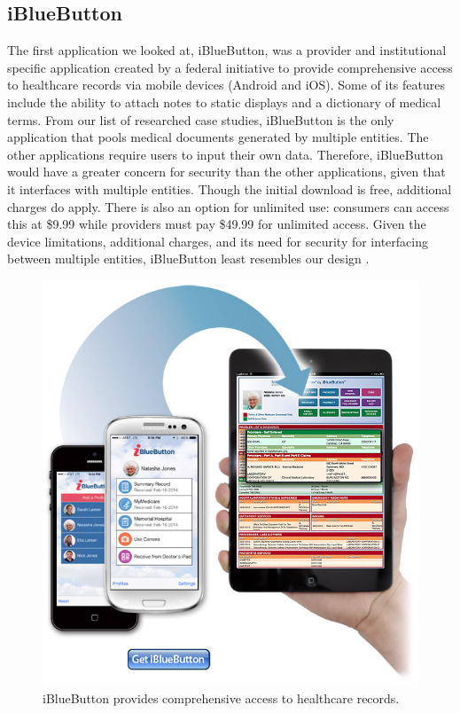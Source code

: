 \documentclass[twocolumn,12pt]{article}
\begin{document}
\subsection{iBlueButton}
The first application we looked at, iBlueButton, was a provider and institutional specific application created by a federal initiative to provide comprehensive access to healthcare records via mobile devices (Android and iOS). Some of its features include the ability to attach notes to static displays and a dictionary of medical terms. From our list of researched case studies, iBlueButton is the only application that pools medical documents generated by multiple entities. The other applications require users to input their own data. Therefore, iBlueButton would have a greater concern for security than the other applications, given that it interfaces with multiple entities. Though the initial download is free, additional charges do apply. There is also an option for unlimited use: consumers can access this at \$9.99 while providers must pay \$49.99 for unlimited access.  Given the device limitations, additional charges, and its need for security for interfacing between multiple entities, iBlueButton least resembles our design \cite{ibluebutton}.

\begin{figure}[!htb] 
	\centering
	\includegraphics[scale=.2]{./490/consumer.jpg}
	\caption{iBlueButton provides comprehensive access to healthcare records.}
\end{figure}
\end{document}

